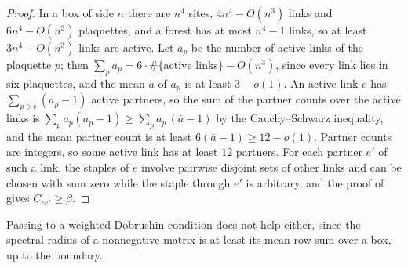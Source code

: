 \begin{proof}
In a box of side $n$ there are $n^{4}$ sites, $4n^{4}-O(n^{3})$ links and $6n^{4}-O(n^{3})$ plaquettes, and a forest has at most $n^{4}-1$ links, so at least $3n^{4}-O(n^{3})$ links are active. Let $a_{p}$ be the number of active links of the plaquette $p$; then $\sum_{p}a_{p}=6\cdot\#\{\text{active links}\}-O(n^{3})$, since every link lies in six plaquettes, and the mean $\bar a$ of $a_{p}$ is at least $3-o(1)$. An active link $e$ has $\sum_{p\ni e}(a_{p}-1)$ active partners, so the sum of the partner counts over the active links is $\sum_{p}a_{p}(a_{p}-1)\ge\sum_{p}a_{p}\,(\bar a-1)$ by the Cauchy--Schwarz inequality, and the mean partner count is at least $6(\bar a-1)\ge12-o(1)$. Partner counts are integers, so some active link has at least $12$ partners. For each partner $e'$ of such a link, the staples of $e$ involve pairwise disjoint sets of other links and can be chosen with sum zero while the staple through $e'$ is arbitrary, and the proof of \cite[Proposition~ceiling]{BB26d} gives $C_{ee'}\ge\beta$.
\end{proof}

Passing to a weighted Dobrushin condition does not help either, since the spectral radius of a nonnegative matrix is at least its mean row sum over a box, up to the boundary.

